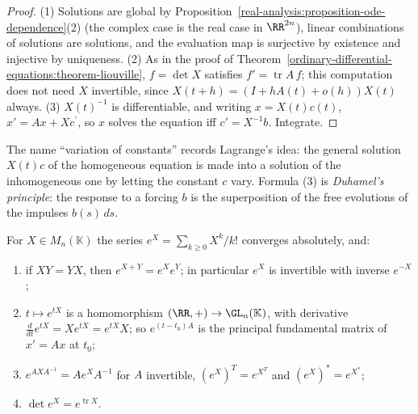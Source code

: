 \begin{proof}
(1) Solutions are global by Proposition~\ref{real-analysis:proposition-ode-dependence}(2) (the complex case is the real case in $\RR^{2n}$), linear combinations of solutions are solutions, and the evaluation map is
surjective by existence and injective by uniqueness. (2) As in the proof of Theorem~\ref{ordinary-differential-equations:theorem-liouville}, $f = \det X$ satisfies $f' = \operatorname{tr}A\,f$; this computation does not need
$X$ invertible, since $X(t + h) = (I + hA(t) + o(h))X(t)$ always. (3) $X(t)^{-1}$ is differentiable, and writing $x = X(t)c(t)$, $x' = Ax + Xc^{\prime}$, so $x$ solves the equation iff $c' = X^{-1}b$. Integrate.
\end{proof}

The name ``variation of constants'' records Lagrange's idea: the general solution $X(t)c$ of the homogeneous equation is made into a solution of the inhomogeneous one by letting the constant $c$ vary. Formula (3) is
\emph{Duhamel's principle}: the response to a forcing $b$ is the superposition of the free evolutions of the impulses $b(s)\,ds$.

\begin{proposition}\label{ordinary-differential-equations:proposition-matrix-exponential}
For $X \in M_n(\mathbb{K})$ the series $e^X = \sum_{k \geq 0}X^k/k!$ converges absolutely, and:
\begin{enumerate}
\item if $XY = YX$, then $e^{X+Y} = e^Xe^Y$; in particular $e^X$ is invertible with inverse $e^{-X}$;
\item $t \mapsto e^{tX}$ is a homomorphism $(\RR, +) \to \GL_n(\mathbb{K})$, with derivative $\frac{d}{dt}e^{tX} = Xe^{tX} = e^{tX}X$; so $e^{(t - t_0)A}$ is the principal fundamental matrix of $x' = Ax$ at $t_0$;
\item $e^{AXA^{-1}} = Ae^XA^{-1}$ for $A$ invertible, $(e^X)^T = e^{X^T}$ and $(e^X)^* = e^{X^*}$;
\item $\det e^X = e^{\operatorname{tr}X}$.
\end{enumerate}
\end{proposition}

